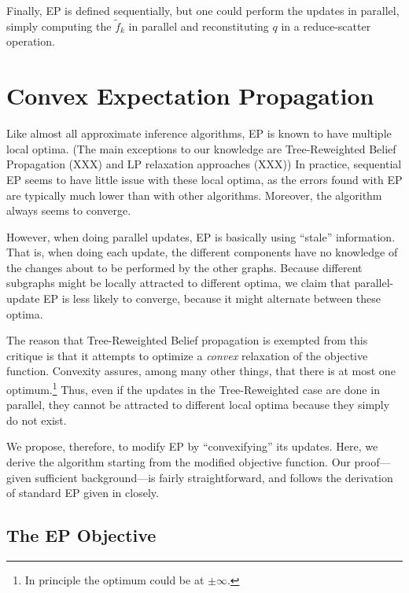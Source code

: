 \documentclass[times, 10pt,twocolumn]{article}
\begin{document}
Finally, EP is defined sequentially, but one could perform the
updates in parallel, simply computing the $\tilde f_k$ in parallel and
reconstituting $q$ in a reduce-scatter operation. 

\section{Convex Expectation Propagation}

Like almost all approximate inference algorithms, EP is known to
have multiple local optima. (The main exceptions to our knowledge
are Tree-Reweighted Belief Propagation (XXX) and LP relaxation
approaches (XXX)) In practice, sequential EP seems to have little
issue with these local optima, as the errors found with EP are
typically much lower than with other algorithms. Moreover, the
algorithm always seems to converge.

However, when doing parallel updates, EP is basically using
``stale'' information. That is, when doing each update, the
different components have no knowledge of the changes about to be
performed by the other graphs. Because different subgraphs might
be locally attracted to different optima, we claim that
parallel-update EP is less likely to converge, because it might
alternate between these optima. 

The reason that Tree-Reweighted Belief propagation is exempted from
this critique is that it attempts to optimize a \textit{convex}
relaxation of the objective function. Convexity assures, among many
other things, that there is at most one optimum.\footnote{In principle
the optimum could be at $\pm\infty$.} Thus, even if the updates in
the Tree-Reweighted case are done in parallel, they cannot be
attracted to different local optima because they simply do not
exist.

We propose, therefore, to modify EP by ``convexifying'' its updates.
Here, we derive the algorithm starting from the modified objective
function. Our proof---given sufficient background---is fairly
straightforward, and follows the derivation of standard EP given in
\cite{wainwright08graphical} closely.

\subsection{The EP Objective}
\end{document}
